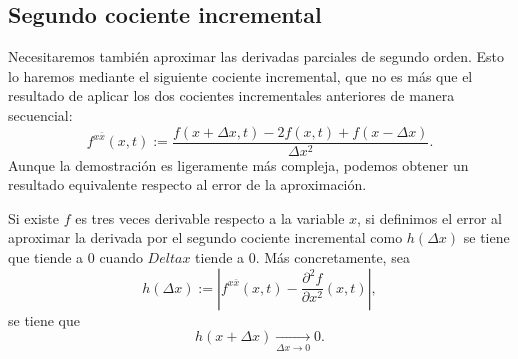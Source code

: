 
\subsection{Segundo cociente incremental}
Necesitaremos también aproximar las derivadas parciales de segundo orden. Esto lo haremos mediante el siguiente cociente incremental, que no es más que el resultado de aplicar los dos cocientes incrementales anteriores de manera secuencial:
\begin{equation}
	\label{eq:not_second}
	f^{x\bar{x}}(x,t) := \frac{f(x+\Delta x,t) - 2f(x,t) + f(x-\Delta x)}{\Delta x^2}.
\end{equation}
Aunque la demostración es ligeramente más compleja, podemos obtener un resultado equivalente respecto al error de la aproximación.

\begin{lema} \label{lema:error_segunda}
	Si existe $f$ es tres veces derivable respecto a la variable $x$, si definimos el error al aproximar la derivada por el segundo cociente incremental como $h(\Delta x)$ se tiene que tiende a 0 cuando $Delta x$ tiende a 0. Más concretamente, sea
	\begin{equation}
		h(\Delta x) := \left| f^{x\bar{x}}(x,t) - \frac{\partial^2 f}{\partial x^2}(x,t) \right| ,
	\end{equation}
	se tiene que
	\begin{equation}\label{eq:lemachap2_3}
		h(x+\Delta x) \xrightarrow[\Delta x\longrightarrow 0]{} 0.
	\end{equation} 
\end{lema}

